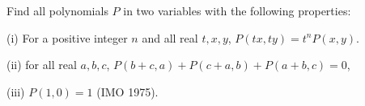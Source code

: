 Find all polynomials $P$ in two variables with the following properties:

(i) For a positive integer $n$ and all real $t, x, y$, $P(tx, ty) = t^nP(x, y)$.

(ii) for all real $a, b, c$, $P(b + c, a) + P(c + a, b) + P(a + b, c) = 0$,

(iii) $P(1, 0) = 1$ (IMO 1975).
